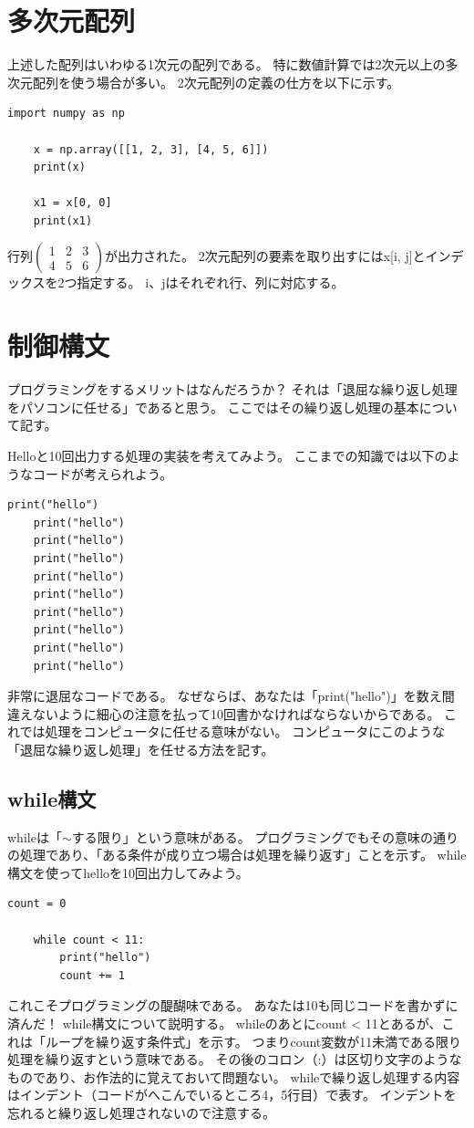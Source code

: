 \documentclass[]{ltjsbook}
\begin{document}
	\section{多次元配列}
	上述した配列はいわゆる1次元の配列である。
	特に数値計算では2次元以上の多次元配列を使う場合が多い。
	2次元配列の定義の仕方を以下に示す。
	\begin{lstlisting}[caption=2darray.py, label=2darray]
	import numpy as np

	x = np.array([[1, 2, 3], [4, 5, 6]])
	print(x)

	x1 = x[0, 0]
	print(x1)
	\end{lstlisting}
	行列$\begin{pmatrix} 1 & 2 & 3 \\ 4 & 5 & 6 \end{pmatrix}$が出力された。
	2次元配列の要素を取り出すにはx[i, j]とインデックスを2つ指定する。
	i、jはそれぞれ行、列に対応する。

	\section{制御構文}
	プログラミングをするメリットはなんだろうか？
	それは「退屈な繰り返し処理をパソコンに任せる」であると思う。
	ここではその繰り返し処理の基本について記す。

	Helloと10回出力する処理の実装を考えてみよう。
	ここまでの知識では以下のようなコードが考えられよう。
	\begin{lstlisting}[caption=hellloop.py, label=helloloop]
	print("hello")
	print("hello")
	print("hello")
	print("hello")
	print("hello")
	print("hello")
	print("hello")
	print("hello")
	print("hello")
	print("hello")
	\end{lstlisting}
	非常に退屈なコードである。
	なぜならば、あなたは「print("hello")」を数え間違えないように細心の注意を払って10回書かなければならないからである。
	これでは処理をコンピュータに任せる意味がない。
	コンピュータにこのような「退屈な繰り返し処理」を任せる方法を記す。
	\subsection{while構文}
	whileは「$\sim$する限り」という意味がある。
	プログラミングでもその意味の通りの処理であり、「ある条件が成り立つ場合は処理を繰り返す」ことを示す。
	while構文を使ってhelloを10回出力してみよう。
	\begin{lstlisting}[caption=whileloop.py, label=hellowhile]
	count = 0

	while count < 11:
		print("hello")
		count += 1
	\end{lstlisting}
	これこそプログラミングの醍醐味である。
	あなたは10も同じコードを書かずに済んだ！
	while構文について説明する。
	whileのあとにcount < 11とあるが、これは「ループを繰り返す条件式」を示す。
	つまりcount変数が11未満である限り処理を繰り返すという意味である。
	その後のコロン（:）は区切り文字のようなものであり、お作法的に覚えておいて問題ない。
	whileで繰り返し処理する内容はインデント（コードがへこんでいるところ4，5行目）で表す。
	インデントを忘れると繰り返し処理されないので注意する。
\end{document}
